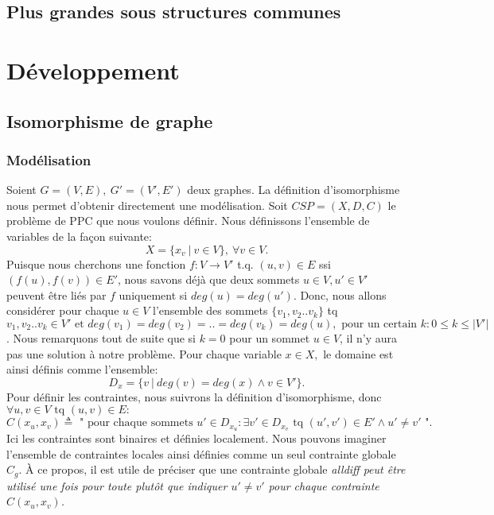\documentclass[french]{article}
\theoremstyle{definition}
\theoremstyle{remark}
\begin{document}
\subsection{Plus grandes sous structures communes}


\newpage
\section{Développement}
\label{sec:Développement}
\subsection{Isomorphisme de graphe}
\subsubsection{Modélisation}
Soient $G=(V, E),\ G'=(V', E')$ deux graphes. 
La définition d'isomorphisme nous permet d'obtenir directement une modélisation. Soit $CSP = (X, D, C)$ le problème de PPC que nous voulons définir. Nous définissons l'ensemble de variables de la façon suivante: 
$$X=\{x_v\ |\ v \in V \},\ \forall v \in V.$$
Puisque nous cherchons une fonction  $f: V \rightarrow V'$ t.q. $ (u,v) \in E$ ssi $ (f(u), f(v)) \in E'$, nous savons déjà que deux sommets $u \in V, u' \in V'$ peuvent être liés par $f$ uniquement si $deg(u) = deg(u')$. Donc, nous allons considérer pour chaque $u \in V$ l'ensemble des sommets $\{v_1, v_2..v_k\}$ tq $v_1, v_2..v_k \in V' \text{ et } deg(v_1)=deg(v_2)=..=deg(v_k)=deg(u), \text{ pour un certain } k: 0 \leq k \leq |V'|$. Nous remarquons tout de suite que si $k=0$ pour un sommet $u \in V$, il n'y aura pas une solution à notre problème. Pour chaque variable $x \in X,$ le domaine est ainsi définis comme l'ensemble: $$D_{x}=\{v\ |\ deg(v)=deg(x) \land v \in V'\}.$$
Pour définir les contraintes, nous suivrons la définition d'isomorphisme, donc $\forall u, v \in V \text{ tq } (u,v) \in E:$
$$C(x_u, x_v) \triangleq \text{ " pour chaque sommets } u' \in D_{x_u}: \exists v' \in D_{x_v} \text{ tq } (u', v') \in E' \land u' \neq v' \text{ "}.$$
Ici les contraintes sont binaires et définies localement. Nous pouvons imaginer l'ensemble de contraintes locales ainsi définies comme un seul contrainte globale $C_g$. À ce propos, il est utile de préciser que une contrainte globale \it alldiff \rm peut être utilisé une fois pour toute plutôt que indiquer $u' \neq v'$ pour chaque contrainte $C(x_u, x_v)$.
\end{document}
